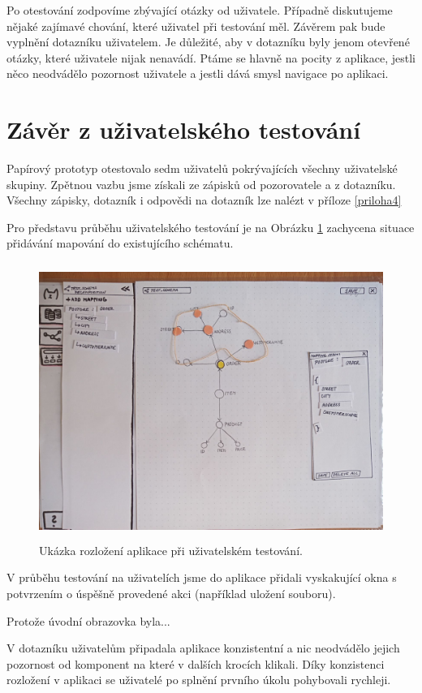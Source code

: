 Po otestování zodpovíme zbývající otázky od uživatele. Případně diskutujeme nějaké zajímavé chování, které uživatel při testování měl. Závěrem pak bude vyplnění dotazníku uživatelem. Je důležité, aby v dotazníku byly jenom otevřené otázky, které uživatele nijak nenavádí. Ptáme se hlavně na pocity z aplikace, jestli něco neodvádělo pozornost uživatele a jestli dává smysl navigace po aplikaci.

\section{Závěr z uživatelského testování}

Papírový prototyp otestovalo sedm uživatelů pokrývajících všechny uživatelské skupiny. Zpětnou vazbu jsme získali ze zápisků od pozorovatele a z dotazníku. Všechny zápisky, dotazník i odpovědi na dotazník lze nalézt v příloze \ref{priloha4}

Pro představu průběhu uživatelského testování je na Obrázku \ref{obr05:ukazka-testovani} zachycena situace přidávání mapování do existujícího schématu.

\begin{figure}[htb]
  \centering
  \includegraphics[height=90mm]{../img/ukazka-testovani}
  \caption{Ukázka rozložení aplikace při uživatelském testování.}
  \label{obr05:ukazka-testovani}
\end{figure}

V průběhu testování na uživatelích jsme do aplikace přidali vyskakující okna s potvrzením o úspěšně provedené akci (například uložení souboru).

Protože úvodní obrazovka byla...

V dotazníku uživatelům připadala aplikace konzistentní a nic neodvádělo jejich pozornost od komponent na které v dalších krocích klikali. Díky konzistenci rozložení v aplikaci se uživatelé po splnění prvního úkolu pohybovali rychleji.

